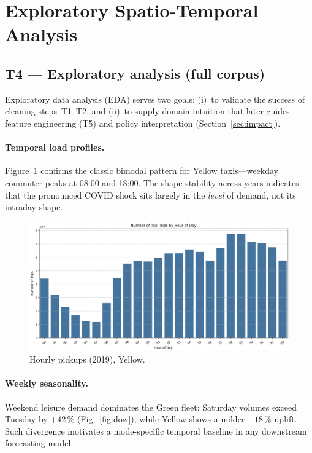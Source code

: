 \documentclass[conference]{IEEEtran}
\begin{document}
\section{Exploratory Spatio-Temporal Analysis}\label{sec:eda}
\subsection{T4 — Exploratory analysis (full corpus)}
\label{sec:t4-explore}

Exploratory data analysis (EDA) serves two goals:  
(i)~to validate the success of cleaning steps~T1–T2, and  
(ii)~to supply domain intuition that later guides feature engineering (T5) and
policy interpretation (Section~\ref{sec:impact}).

\paragraph*{Temporal load profiles.}
Figure~\ref{fig:hour-of-day} confirms the classic bimodal pattern for Yellow
taxis—weekday commuter peaks at 08:00 and 18:00. The
shape stability across years indicates that the pronounced COVID shock sits
largely in the \emph{level} of demand, not its intraday shape.

\begin{figure}[htbp]
  \centering
  \includegraphics[width=0.95\linewidth]{hour_of_day_trips.png}
  \caption{Hourly pickups (2019), Yellow.}
  \label{fig:hour-of-day}
\end{figure}

\paragraph*{Weekly seasonality.}
Weekend leisure demand dominates the Green fleet: Saturday volumes exceed
Tuesday by \(+42\,\%\) (Fig.~\ref{fig:dow}), while Yellow shows a milder
\( +18\,\% \) uplift.  Such divergence motivates a mode-specific temporal
baseline in any downstream forecasting model.
\end{document}
